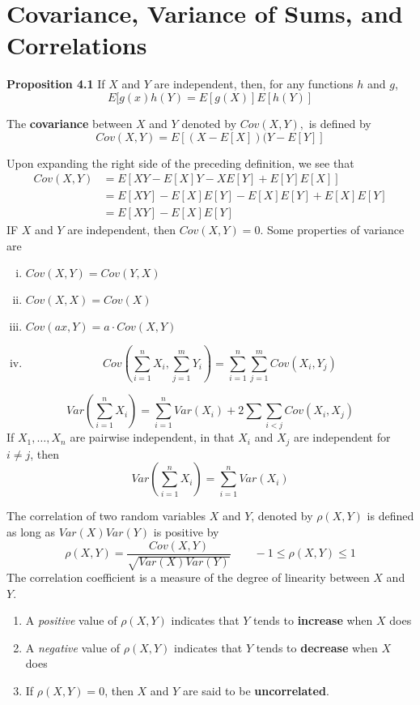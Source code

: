\section{Covariance, Variance of Sums, and Correlations}
\textbf{Proposition 4.1}
If $X$ and $Y$ are independent, then, for any functions $h$ and $g$, \[E[g(x)h(Y) = E[g(X)]E[h(Y)]\]
\begin{definition}
The \textbf{covariance} between $X$ and $Y$ denoted by $Cov(X,Y),$ is defined by \[Cov(X,Y) = E[(X-E[X])(Y-E[Y]]\]
\end{definition}
Upon expanding the right side of the preceding definition, we see that 
\begin{equation*}
    \begin{split}
        Cov (X,Y) &= E[XY - E[X]Y - XE[Y] + E[Y]E[X]]\\
        &= E[XY] - E[X]E[Y] - E[X]E[Y] + E[X]E[Y]\\
        &= E[XY] - E[X]E[Y]
    \end{split}
\end{equation*}
IF $X$ and $Y$ are independent, then $Cov(X,Y) = 0$. Some properties of variance are 
\begin{enumerate}[i. ]
    \item $Cov(X,Y) = Cov(Y,X)$
    \item $Cov(X, X) = Cov(X)$
    \item $Cov(ax, Y) = a\cdot Cov(X,Y)$
    \item \[Cov\left(\sum^n_{i = 1} X_i, \sum^m_{j = 1} Y_i \right) = \sum^n_{i = 1}\sum^m_{j = 1} Cov (X_i, Y_j)\]
\end{enumerate}
\[Var\left(\sum^n_{i=1} X_i\right) = \sum^n_{i=1} Var(X_i) + 2\sum\sum_{i < j} Cov(X_i,X_j)\]
If $X_1, \dots, X_n$ are pairwise independent, in that $X_i$ and $X_j$ are independent for $i\neq j$, then
\[Var\left(\sum^n_{i=1} X_i\right) = \sum^n_{i = 1} Var(X_i)\]
\begin{definition}[Correlation]
    The correlation of two random variables $X$ and $Y$, denoted by $\rho (X,Y)$ is defined as long as $Var(X)Var(Y)$ is positive by \[\rho(X,Y) = \frac{Cov(X,Y)}{\sqrt{Var(X)Var(Y)}}\qquad -1\leq \rho(X,Y)\leq 1\]
    The correlation coefficient is a measure of the degree of linearity between $X$ and $Y$. \begin{enumerate}
        \item A \textit{positive} value of $\rho(X,Y)$ indicates that $Y$ tends to \textbf{increase} when $X$ does
        \item A \textit{negative} value of $\rho(X,Y)$ indicates that $Y$ tends to \textbf{decrease} when $X$ does
        \item If $\rho(X,Y) = 0$, then $X$ and $Y$ are said to be \textbf{uncorrelated}.
    \end{enumerate}
\end{definition}
